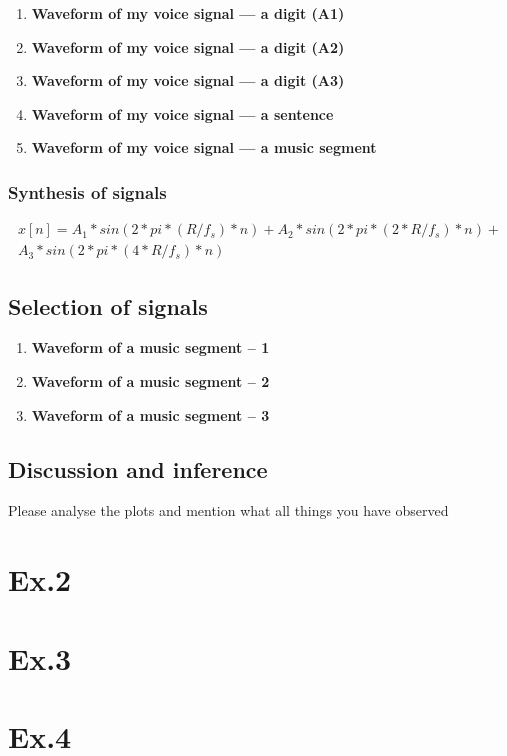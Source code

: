 \begin{enumerate}
      
      
      \item \textbf{Waveform of my voice signal --- a digit (A1)}
      \item \textbf{Waveform of my voice signal --- a digit (A2)} 
      \item  \textbf{Waveform of my voice signal --- a digit (A3)} 
      \item  \textbf{Waveform of my voice signal --- a sentence}
       \item \textbf{Waveform of my voice signal --- a music segment}
  \end{enumerate}
 
  \subsection{Synthesis of signals}
  
  \begin{multline*}
       x[n] = A_1*sin(2*pi*(R/f_s)*n) + A_2*sin(2*pi*(2*R/f_s)*n) +  \\ A_3*sin(2*pi*(4*R/f_s)*n)
  \end{multline*}
     
 
  \section{Selection of signals}
  
  \begin{enumerate}
      \item \textbf{Waveform of a music segment  -- 1}
      \item \textbf{Waveform of a music segment  -- 2}
      \item \textbf{Waveform of a music segment  -- 3}
  \end{enumerate}
 \section{Discussion and inference}
 
 Please analyse the plots and mention what all things you have observed 
  \chapter{Ex.2}
  \chapter{Ex.3}
  \chapter{Ex.4}
